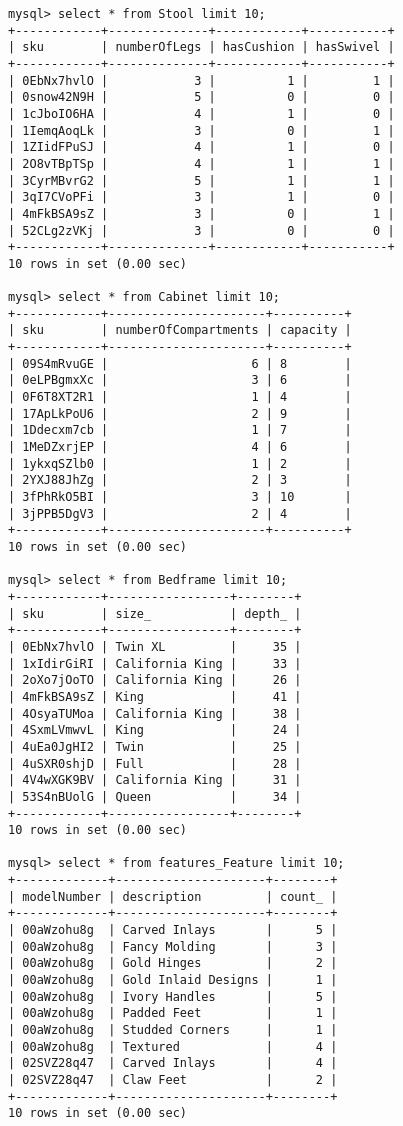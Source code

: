 \documentclass[american,extrafontsizes,12pt,portrait,letterpaper,oneside,onecolumn,article,final]{memoir}
\begin{document}
\begin{verbatim}
mysql> select * from Stool limit 10;
+------------+--------------+------------+-----------+
| sku        | numberOfLegs | hasCushion | hasSwivel |
+------------+--------------+------------+-----------+
| 0EbNx7hvlO |            3 |          1 |         1 |
| 0snow42N9H |            5 |          0 |         0 |
| 1cJboIO6HA |            4 |          1 |         0 |
| 1IemqAoqLk |            3 |          0 |         1 |
| 1ZIidFPuSJ |            4 |          1 |         0 |
| 2O8vTBpTSp |            4 |          1 |         1 |
| 3CyrMBvrG2 |            5 |          1 |         1 |
| 3qI7CVoPFi |            3 |          1 |         0 |
| 4mFkBSA9sZ |            3 |          0 |         1 |
| 52CLg2zVKj |            3 |          0 |         0 |
+------------+--------------+------------+-----------+
10 rows in set (0.00 sec)

mysql> select * from Cabinet limit 10;
+------------+----------------------+----------+
| sku        | numberOfCompartments | capacity |
+------------+----------------------+----------+
| 09S4mRvuGE |                    6 | 8        |
| 0eLPBgmxXc |                    3 | 6        |
| 0F6T8XT2R1 |                    1 | 4        |
| 17ApLkPoU6 |                    2 | 9        |
| 1Ddecxm7cb |                    1 | 7        |
| 1MeDZxrjEP |                    4 | 6        |
| 1ykxqSZlb0 |                    1 | 2        |
| 2YXJ88JhZg |                    2 | 3        |
| 3fPhRkO5BI |                    3 | 10       |
| 3jPPB5DgV3 |                    2 | 4        |
+------------+----------------------+----------+
10 rows in set (0.00 sec)

mysql> select * from Bedframe limit 10;
+------------+-----------------+--------+
| sku        | size_           | depth_ |
+------------+-----------------+--------+
| 0EbNx7hvlO | Twin XL         |     35 |
| 1xIdirGiRI | California King |     33 |
| 2oXo7jOoTO | California King |     26 |
| 4mFkBSA9sZ | King            |     41 |
| 4OsyaTUMoa | California King |     38 |
| 4SxmLVmwvL | King            |     24 |
| 4uEa0JgHI2 | Twin            |     25 |
| 4uSXR0shjD | Full            |     28 |
| 4V4wXGK9BV | California King |     31 |
| 53S4nBUolG | Queen           |     34 |
+------------+-----------------+--------+
10 rows in set (0.00 sec)

mysql> select * from features_Feature limit 10;
+-------------+---------------------+--------+
| modelNumber | description         | count_ |
+-------------+---------------------+--------+
| 00aWzohu8g  | Carved Inlays       |      5 |
| 00aWzohu8g  | Fancy Molding       |      3 |
| 00aWzohu8g  | Gold Hinges         |      2 |
| 00aWzohu8g  | Gold Inlaid Designs |      1 |
| 00aWzohu8g  | Ivory Handles       |      5 |
| 00aWzohu8g  | Padded Feet         |      1 |
| 00aWzohu8g  | Studded Corners     |      1 |
| 00aWzohu8g  | Textured            |      4 |
| 02SVZ28q47  | Carved Inlays       |      4 |
| 02SVZ28q47  | Claw Feet           |      2 |
+-------------+---------------------+--------+
10 rows in set (0.00 sec)
\end{verbatim}
\end{document}
